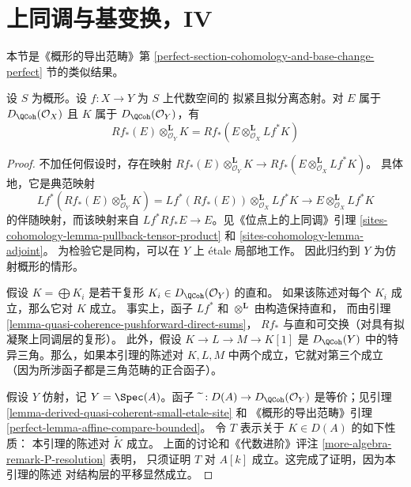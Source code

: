 \section{上同调与基变换，IV}
\label{section-cohomology-and-base-change-perfect}

\noindent
本节是《概形的导出范畴》第
\ref{perfect-section-cohomology-and-base-change-perfect} 节的类似结果。

\begin{lemma}
\label{lemma-cohomology-base-change}
设 $S$ 为概形。设 $f : X \to Y$ 为 $S$ 上代数空间的
拟紧且拟分离态射。对 $E$ 属于
$D_\QCoh(\mathcal{O}_X)$ 且 $K$ 属于
$D_\QCoh(\mathcal{O}_Y)$，有
$$
Rf_*(E) \otimes_{\mathcal{O}_Y}^\mathbf{L} K =
Rf_*(E \otimes_{\mathcal{O}_X}^\mathbf{L} Lf^*K)
$$
\end{lemma}

\begin{proof}
不加任何假设时，存在映射
$Rf_*(E) \otimes_{\mathcal{O}_Y}^\mathbf{L} K \to
Rf_*(E \otimes_{\mathcal{O}_X}^\mathbf{L} Lf^*K)$。
具体地，它是典范映射
$$
Lf^*(Rf_*(E) \otimes_{\mathcal{O}_Y}^\mathbf{L} K) =
Lf^*(Rf_*(E)) \otimes_{\mathcal{O}_X}^\mathbf{L} Lf^*K
\longrightarrow
E \otimes_{\mathcal{O}_X}^\mathbf{L} Lf^*K
$$
的伴随映射，而该映射来自 $Lf^*Rf_*E \to E$。见《位点上的上同调》引理
\ref{sites-cohomology-lemma-pullback-tensor-product} 和
\ref{sites-cohomology-lemma-adjoint}。
为检验它是同构，可以在 $Y$ 上 \'etale 局部地工作。
因此归约到 $Y$ 为仿射概形的情形。

\medskip\noindent
假设 $K = \bigoplus K_i$ 是若干复形
$K_i \in D_\QCoh(\mathcal{O}_Y)$ 的直和。
如果该陈述对每个 $K_i$ 成立，那么它对 $K$ 成立。
事实上，函子 $Lf^*$ 和 $\otimes^\mathbf{L}$ 由构造保持直和，
而由引理 \ref{lemma-quasi-coherence-pushforward-direct-sums}，
$Rf_*$ 与直和可交换（对具有拟凝聚上同调层的复形）。
此外，假设 $K \to L \to M \to K[1]$ 是
$D_\QCoh(Y)$ 中的特异三角。那么，如果本引理的陈述对
$K, L, M$ 中两个成立，它就对第三个成立
（因为所涉函子都是三角范畴的正合函子）。

\medskip\noindent
假设 $Y$ 仿射，记 $Y = \Spec(A)$。函子
$\widetilde{\ } : D(A) \to D_\QCoh(\mathcal{O}_Y)$ 是等价；见引理
\ref{lemma-derived-quasi-coherent-small-etale-site} 和
《概形的导出范畴》引理
\ref{perfect-lemma-affine-compare-bounded}。
令 $T$ 表示关于 $K \in D(A)$ 的如下性质：
本引理的陈述对 $\widetilde{K}$ 成立。
上面的讨论和《代数进阶》评注
\ref{more-algebra-remark-P-resolution} 表明，%
只须证明 $T$ 对 $A[k]$ 成立。这完成了证明，因为本引理的陈述
对结构层的平移显然成立。
\end{proof}

